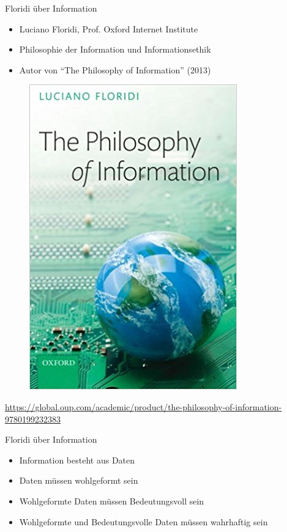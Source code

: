 \documentclass{beamer}
\begin{document}
\begin{frame}{Floridi über Information}
	
	\begin{itemize}
		\item Luciano Floridi, Prof. Oxford Internet Institute
		\item Philosophie der Information und Informationsethik
		\item Autor von ``The Philosophy of Information'' (2013)
	\end{itemize}
	
	\begin{figure}
		\includegraphics[scale=0.20,right]{floridi-book-cover.jpg}
	\end{figure}
	
	\tiny
	\begin{flushright}
		\url{https://global.oup.com/academic/product/the-philosophy-of-information-9780199232383}
	\end{flushright}
	
\end{frame}

\begin{frame}{Floridi über Information}
	
	\begin{itemize}
		\item Information besteht aus Daten
		\item Daten müssen wohlgeformt sein
		\item Wohlgeformte Daten müssen Bedeutungsvoll sein
		\item Wohlgeformte und Bedeutungsvolle Daten müssen wahrhaftig sein
	\end{itemize}
	
\end{frame}
\end{document}
